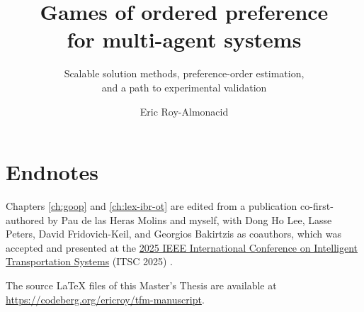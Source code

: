 \documentclass[master,english]{tfgitic}
\title{Games of ordered preference \\for multi-agent systems}
\subtitle{Scalable solution methods, preference-order estimation, \\and a path to experimental validation}
\author[m]{Eric Roy-Almonacid}
\begin{document}








\chapter*{Endnotes}

Chapters \ref{ch:goop} and \ref{ch:lex-ibr-ot} are edited from a publication co-first-authored by Pau de las Heras Molins and
myself, with Dong Ho Lee, Lasse Peters, David Fridovich-Keil, and Georgios Bakirtzis as
coauthors, which was accepted and presented at the \href{https://ieee-itsc.org/2025/}
{2025 IEEE International Conference on Intelligent Transportation Systems} (ITSC 2025) \cite{heras:2025}.

The source \LaTeX{} files of this Master's Thesis are available at \url{https://codeberg.org/ericroy/tfm-manuscript}.

\printbibliography
\end{document}
